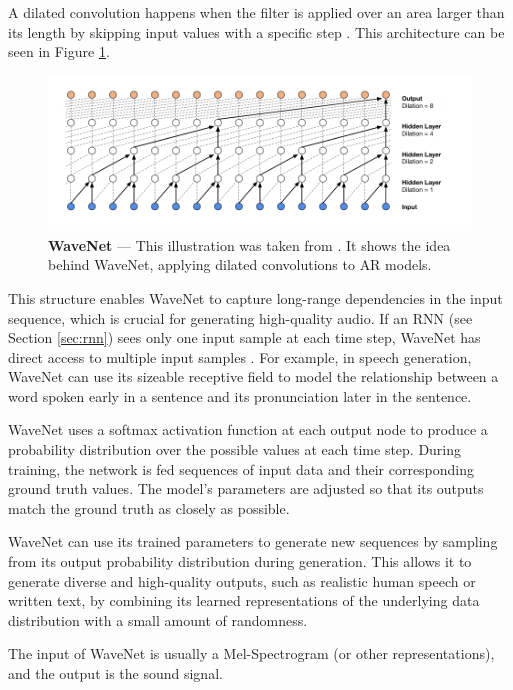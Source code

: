 A dilated convolution happens when the filter is applied over an area larger than its length by skipping input values with a specific step \cite{oord_wavenet_2016}. This architecture can be seen in Figure \ref{fig:dilated-convolution}.

\begin{figure}[ht]
    \centering
    \includegraphics[width=\textwidth]{figures/2-sota/dilated-convolution.png}
    \caption[WaveNet]{\textbf{WaveNet} --- This illustration was taken from \cite{oord_wavenet_2016}. It shows the idea behind WaveNet, applying dilated convolutions to \ac{AR} models.}
    \label{fig:dilated-convolution}
\end{figure}

This structure enables WaveNet to capture long-range dependencies in the input sequence, which is crucial for generating high-quality audio. If an \ac{RNN} (see Section \ref{sec:rnn}) sees only one input sample at each time step, WaveNet has direct access to multiple input samples \cite{huzaifah_deep_2021}. For example, in speech generation, WaveNet can use its sizeable receptive field to model the relationship between a word spoken early in a sentence and its pronunciation later in the sentence.

WaveNet uses a softmax activation function at each output node to produce a probability distribution over the possible values at each time step. During training, the network is fed sequences of input data and their corresponding ground truth values. The model's parameters are adjusted so that its outputs match the ground truth as closely as possible.

WaveNet can use its trained parameters to generate new sequences by sampling from its output probability distribution during generation. This allows it to generate diverse and high-quality outputs, such as realistic human speech or written text, by combining its learned representations of the underlying data distribution with a small amount of randomness.

The input of WaveNet is usually a Mel-Spectrogram (or other representations), and the output is the sound signal.

